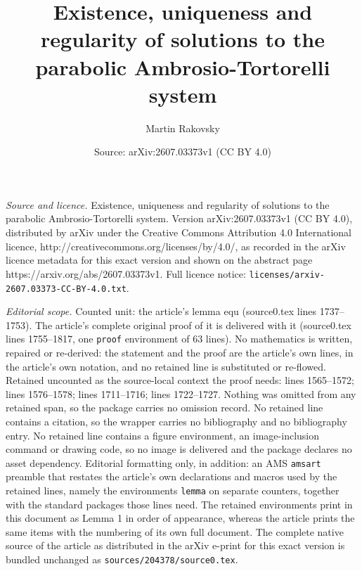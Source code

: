 \documentclass[10pt,a4paper]{amsart}
\title{Existence, uniqueness and regularity of solutions to the parabolic Ambrosio-Tortorelli system}
\author{Martin Rakovsky}
\date{Source: arXiv:2607.03373v1 (CC BY 4.0)}
\begin{document}
\maketitle

\noindent\emph{Source and licence.} Existence, uniqueness and regularity of solutions to the parabolic Ambrosio-Tortorelli system. Version arXiv:2607.03373v1 (CC BY 4.0), distributed by arXiv under the Creative Commons Attribution 4.0 International licence, http://creativecommons.org/licenses/by/4.0/, as recorded in the arXiv licence metadata for this exact version and shown on the abstract page https://arxiv.org/abs/2607.03373v1. Full licence notice: \texttt{licenses/arxiv-2607.03373-CC-BY-4.0.txt}.\par\smallskip

\noindent\textit{Editorial scope.} Counted unit: the article's lemma equ (source0.tex lines 1737--1753). The article's complete original proof of it is delivered with it (source0.tex lines 1755--1817, one \texttt{proof} environment of 63 lines). No mathematics is written, repaired or re-derived: the statement and the proof are the article's own lines, in the article's own notation, and no retained line is substituted or re-flowed.  Retained uncounted as the source-local context the proof needs: lines 1565--1572; lines 1576--1578; lines 1711--1716; lines 1722--1727.  Nothing was omitted from any retained span, so the package carries no omission record.  No retained line contains a citation, so the wrapper carries no bibliography and no bibliography entry.  No retained line contains a figure environment, an image-inclusion command or drawing code, so no image is delivered and the package declares no asset dependency.  Editorial formatting only, in addition: an AMS \texttt{amsart} preamble that restates the article's own declarations and macros used by the retained lines, namely the environments \texttt{lemma} on separate counters, together with the standard packages those lines need.  The retained environments print in this document as Lemma 1 in order of appearance, whereas the article prints the same items with the numbering of its own full document.  The complete native source of the article as distributed in the arXiv e-print for this exact version is bundled unchanged as \texttt{sources/204378/source0.tex}.
\end{document}
